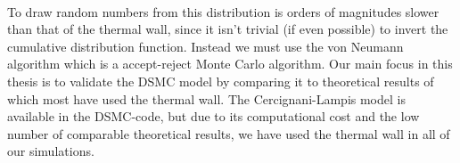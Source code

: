 \\
To draw random numbers from this distribution is orders of magnitudes slower than that of the thermal wall, since it isn't trivial (if even possible) to invert the cumulative distribution function. Instead we must use the von Neumann algorithm which is a accept-reject Monte Carlo algorithm\cite{allen1989computer}. Our main focus in this thesis is to validate the DSMC model by comparing it to theoretical results of which most have used the thermal wall. The Cercignani-Lampis model is available in the DSMC-code, but due to its computational cost and the low number of comparable theoretical results, we have used the thermal wall in all of our simulations. 